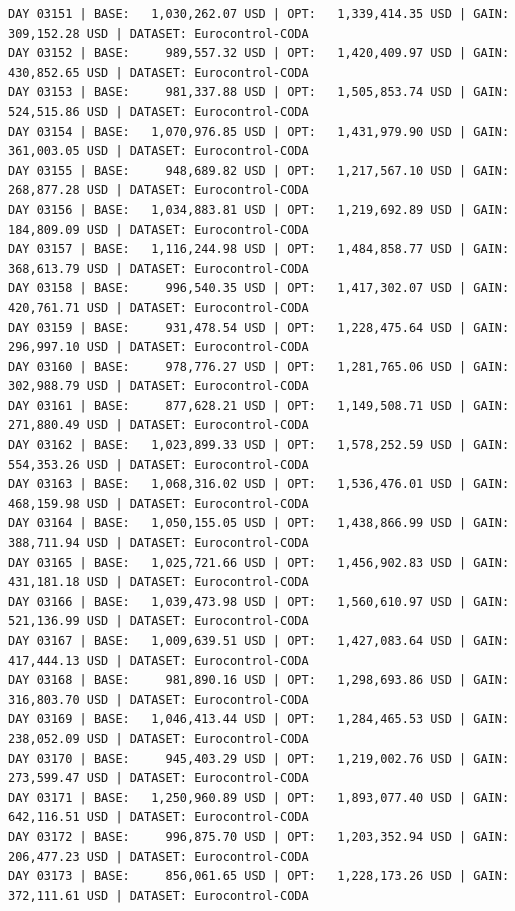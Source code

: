 \documentclass[11pt,a4paper]{article}
\begin{document}
\begin{verbatim}
DAY 03151 | BASE:   1,030,262.07 USD | OPT:   1,339,414.35 USD | GAIN: 309,152.28 USD | DATASET: Eurocontrol-CODA
DAY 03152 | BASE:     989,557.32 USD | OPT:   1,420,409.97 USD | GAIN: 430,852.65 USD | DATASET: Eurocontrol-CODA
DAY 03153 | BASE:     981,337.88 USD | OPT:   1,505,853.74 USD | GAIN: 524,515.86 USD | DATASET: Eurocontrol-CODA
DAY 03154 | BASE:   1,070,976.85 USD | OPT:   1,431,979.90 USD | GAIN: 361,003.05 USD | DATASET: Eurocontrol-CODA
DAY 03155 | BASE:     948,689.82 USD | OPT:   1,217,567.10 USD | GAIN: 268,877.28 USD | DATASET: Eurocontrol-CODA
DAY 03156 | BASE:   1,034,883.81 USD | OPT:   1,219,692.89 USD | GAIN: 184,809.09 USD | DATASET: Eurocontrol-CODA
DAY 03157 | BASE:   1,116,244.98 USD | OPT:   1,484,858.77 USD | GAIN: 368,613.79 USD | DATASET: Eurocontrol-CODA
DAY 03158 | BASE:     996,540.35 USD | OPT:   1,417,302.07 USD | GAIN: 420,761.71 USD | DATASET: Eurocontrol-CODA
DAY 03159 | BASE:     931,478.54 USD | OPT:   1,228,475.64 USD | GAIN: 296,997.10 USD | DATASET: Eurocontrol-CODA
DAY 03160 | BASE:     978,776.27 USD | OPT:   1,281,765.06 USD | GAIN: 302,988.79 USD | DATASET: Eurocontrol-CODA
DAY 03161 | BASE:     877,628.21 USD | OPT:   1,149,508.71 USD | GAIN: 271,880.49 USD | DATASET: Eurocontrol-CODA
DAY 03162 | BASE:   1,023,899.33 USD | OPT:   1,578,252.59 USD | GAIN: 554,353.26 USD | DATASET: Eurocontrol-CODA
DAY 03163 | BASE:   1,068,316.02 USD | OPT:   1,536,476.01 USD | GAIN: 468,159.98 USD | DATASET: Eurocontrol-CODA
DAY 03164 | BASE:   1,050,155.05 USD | OPT:   1,438,866.99 USD | GAIN: 388,711.94 USD | DATASET: Eurocontrol-CODA
DAY 03165 | BASE:   1,025,721.66 USD | OPT:   1,456,902.83 USD | GAIN: 431,181.18 USD | DATASET: Eurocontrol-CODA
DAY 03166 | BASE:   1,039,473.98 USD | OPT:   1,560,610.97 USD | GAIN: 521,136.99 USD | DATASET: Eurocontrol-CODA
DAY 03167 | BASE:   1,009,639.51 USD | OPT:   1,427,083.64 USD | GAIN: 417,444.13 USD | DATASET: Eurocontrol-CODA
DAY 03168 | BASE:     981,890.16 USD | OPT:   1,298,693.86 USD | GAIN: 316,803.70 USD | DATASET: Eurocontrol-CODA
DAY 03169 | BASE:   1,046,413.44 USD | OPT:   1,284,465.53 USD | GAIN: 238,052.09 USD | DATASET: Eurocontrol-CODA
DAY 03170 | BASE:     945,403.29 USD | OPT:   1,219,002.76 USD | GAIN: 273,599.47 USD | DATASET: Eurocontrol-CODA
DAY 03171 | BASE:   1,250,960.89 USD | OPT:   1,893,077.40 USD | GAIN: 642,116.51 USD | DATASET: Eurocontrol-CODA
DAY 03172 | BASE:     996,875.70 USD | OPT:   1,203,352.94 USD | GAIN: 206,477.23 USD | DATASET: Eurocontrol-CODA
DAY 03173 | BASE:     856,061.65 USD | OPT:   1,228,173.26 USD | GAIN: 372,111.61 USD | DATASET: Eurocontrol-CODA

\end{verbatim}
\end{document}
